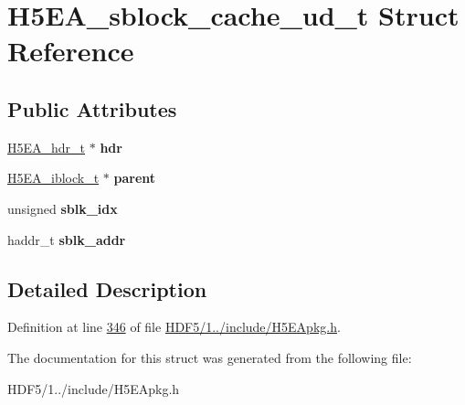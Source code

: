 \hypertarget{struct_h5_e_a__sblock__cache__ud__t}{}\section{H5\+E\+A\+\_\+sblock\+\_\+cache\+\_\+ud\+\_\+t Struct Reference}
\label{struct_h5_e_a__sblock__cache__ud__t}
\subsection*{Public Attributes}
\begin{DoxyCompactItemize}
\item 
\mbox{\label{struct_h5_e_a__sblock__cache__ud__t_ab848fd60e3c282d8fc376c3081625796}} 
\hyperlink{struct_h5_e_a__hdr__t}{H5\+E\+A\+\_\+hdr\+\_\+t} $\ast$ {\bfseries hdr}
\item 
\mbox{\label{struct_h5_e_a__sblock__cache__ud__t_ac4f397edd54283c035f13e353d6c21ac}} 
\hyperlink{struct_h5_e_a__iblock__t}{H5\+E\+A\+\_\+iblock\+\_\+t} $\ast$ {\bfseries parent}
\item 
\mbox{\label{struct_h5_e_a__sblock__cache__ud__t_a18066310d613cfc13343fbcc667832f9}} 
unsigned {\bfseries sblk\+\_\+idx}
\item 
\mbox{\label{struct_h5_e_a__sblock__cache__ud__t_a4dc89403c99e0f905b1f18e6c0da6463}} 
haddr\+\_\+t {\bfseries sblk\+\_\+addr}
\end{DoxyCompactItemize}


\subsection{Detailed Description}


Definition at line \hyperlink{_h_d_f5_21_810_81_2include_2_h5_e_apkg_8h_source_l00346}{346} of file \hyperlink{_h_d_f5_21_810_81_2include_2_h5_e_apkg_8h_source}{H\+D\+F5/1../include/\+H5\+E\+Apkg.\+h}.



The documentation for this struct was generated from the following file\+:\begin{DoxyCompactItemize}
\item 
H\+D\+F5/1../include/\+H5\+E\+Apkg.\+h\end{DoxyCompactItemize}
